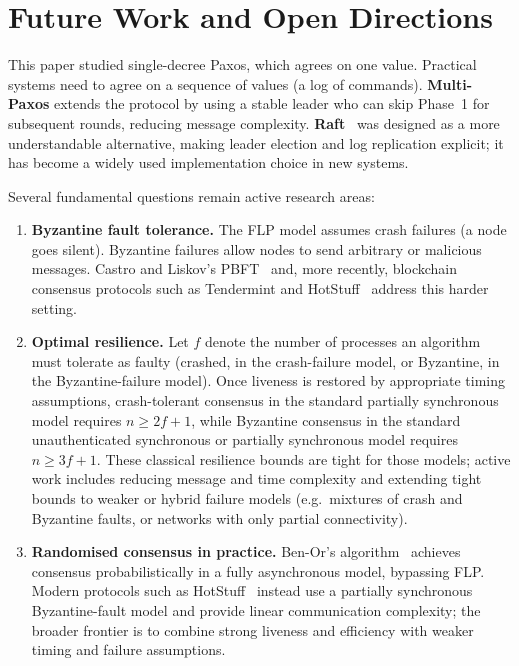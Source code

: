 \section{Future Work and Open Directions}%

This paper studied single-decree Paxos, which agrees on one value. Practical systems need to agree on a sequence of values (a log of commands). \textbf{Multi-Paxos} extends the protocol by using a stable leader who can skip Phase~1 for subsequent rounds, reducing message complexity. \textbf{Raft}~\cite{ongaro2014} was designed as a more understandable alternative, making leader election and log replication explicit; it has become a widely used implementation choice in new systems.

Several fundamental questions remain active research areas:

\begin{enumerate}[label=(\roman*)]
    \item \textbf{Byzantine fault tolerance.} The FLP model assumes crash failures (a node goes silent). Byzantine failures allow nodes to send arbitrary or malicious messages. Castro and Liskov's PBFT~\cite{castroliskov1999} and, more recently, blockchain consensus protocols such as Tendermint and HotStuff~\cite{yin2019} address this harder setting.
    \item \textbf{Optimal resilience.} Let $f$ denote the number of processes an algorithm must tolerate as faulty (crashed, in the crash-failure model, or Byzantine, in the Byzantine-failure model). Once liveness is restored by appropriate timing assumptions, crash-tolerant consensus in the standard partially synchronous model requires $n \geq 2f+1$, while Byzantine consensus in the standard unauthenticated synchronous or partially synchronous model requires $n \geq 3f+1$. These classical resilience bounds are tight for those models; active work includes reducing message and time complexity and extending tight bounds to weaker or hybrid failure models (e.g.\ mixtures of crash and Byzantine faults, or networks with only partial connectivity).
    \item \textbf{Randomised consensus in practice.} Ben-Or's algorithm~\cite{benor1983} achieves consensus probabilistically in a fully asynchronous model, bypassing FLP. Modern protocols such as HotStuff~\cite{yin2019} instead use a partially synchronous Byzantine-fault model and provide linear communication complexity; the broader frontier is to combine strong liveness and efficiency with weaker timing and failure assumptions.
\end{enumerate}



